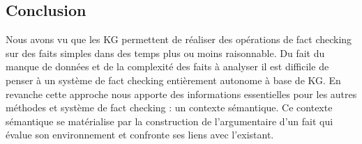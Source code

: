 \subsection{Conclusion}

Nous avons vu que les KG permettent de réaliser des opérations de fact checking sur des faits simples dans des temps plus ou moins raisonnable. Du fait du manque de données et de la complexité des faits à analyser il est difficile de penser à un système de fact checking entièrement autonome à base de KG. En revanche cette approche nous apporte des informations essentielles pour les autres méthodes et système de fact checking : un contexte sémantique. Ce contexte sémantique se matérialise par la construction de l'argumentaire d'un fait qui évalue son environnement et confronte ses liens avec l'existant. 


